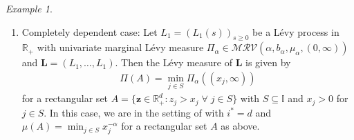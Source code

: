 \documentclass[aos]{imsart}
\numberwithin{equation}{section}
\theoremstyle{plain} %
\theoremstyle{remark}
\newtheorem{example}[theorem]{Example}
\newcommand{\beao}{\begin{eqnarray*}}
\newcommand{\eeao}{\end{eqnarray*}\noindent}
\newcommand{\R}{\mathbb{R}}
\def\MRV{\mathcal{MRV}}
\def\bL{\boldsymbol L}
\def\bz{\boldsymbol z}
\newcommand{\ov}{\overline}
\begin{document}
\begin{example}  $\mbox{}$
\begin{enumerate}
    \item[(a)] Completely dependent case: Let $L_1=(L_1(s))_{s\geq 0}$ be a L\'evy process in $\R_+$ with univariate marginal L\'evy measure $\Pi_\alpha\in \MRV(\alpha,b_{\alpha},\mu_\alpha,(0,\infty))$ and $\bL=(L_1,\ldots,L_1)$. Then the L\'evy measure of $\bL$ is given by
    \beao
        \Pi(A)=\min_{j\in S}\Pi_\alpha((x_j,\infty))
    \eeao
    for a rectangular set $A= \{\bz \in \R_+^d: z_j>x_j \;\forall\; j\in S\}$  with
 $S\subseteq \mathbb{I}$ and  $x_{j}>0$ for $j\in S$.
   In this case, we are in the setting of  with $i^*=d$ and $\mu(A)=\min_{j\in S}x_j^{-\alpha}$ for
   a rectangular set $A$ as above.
   

\end{enumerate}
\end{example}
\end{document}
